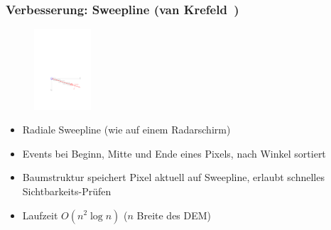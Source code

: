 \documentclass{beamer}
\begin{document}
\begin{frame}
  \frametitle{Verbesserung: Sweepline (van Krefeld~\cite{van1996variations})}
  \begin{figure}[h]
    \centering
    \includegraphics[height=3cm]{Sweep.pdf}
    \label{fig:sweepline}
  \end{figure}
  \begin{itemize}
    \item Radiale Sweepline (wie auf einem Radarschirm)
    \item Events bei Beginn, Mitte und Ende eines Pixels, nach Winkel sortiert
    \item Baumstruktur speichert Pixel aktuell auf Sweepline, erlaubt schnelles Sichtbarkeits-Prüfen
    \item<2-> Laufzeit $O(n^2 \log{n})$ ($n$ Breite des DEM)
  \end{itemize}
\end{frame}
\end{document}
